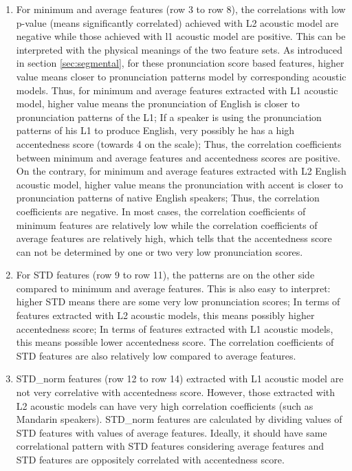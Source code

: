 \begin{enumerate}
 \item For minimum and average features (row 3 to row 8), the correlations with low p-value (means significantly correlated) achieved with L2 acoustic model are negative while those achieved with l1 acoustic model are positive. This can be interpreted with the physical meanings of the two feature sets. As introduced in section \ref{sec:segmental}, for these pronunciation score based features, higher value means closer to pronunciation patterns model by corresponding acoustic models. Thus, for minimum and average features extracted with L1 acoustic model, higher value means the pronunciation of English is closer to pronunciation patterns of the L1; If a speaker is using the pronunciation patterns of his L1 to produce English, very possibly he has a high accentedness score (towards 4 on the scale); Thus, the correlation coefficients between minimum and average features and accentedness scores are positive. On the contrary, for minimum and average features extracted with L2 English acoustic model, higher value means the pronunciation with accent is closer to pronunciation patterns of native English speakers; Thus, the correlation coefficients are negative. In most cases, the correlation coefficients of minimum features are relatively low while the correlation coefficients of average features are relatively high, which tells that the accentedness score can not be determined by one or two very low pronunciation scores.
 \item For STD features (row 9 to row 11), the patterns are on the other side compared to minimum and average features. This is also easy to interpret: higher STD means there are some very low pronunciation scores; In terms of features extracted with L2 acoustic models, this means possibly higher accentedness score; In terms of features extracted with L1 acoustic models, this means possible lower accentedness score. The correlation coefficients of STD features are also relatively low compared to average features.
 \item STD\_norm features (row 12 to row 14) extracted with L1 acoustic model are not very correlative with accentedness score. However, those extracted with L2 acoustic models can have very high correlation coefficients (such as Mandarin speakers). STD\_norm features are calculated by dividing values of STD features with values of average features. Ideally, it should have same correlational pattern with STD features considering average features and STD features are oppositely correlated with accentedness score.

\end{enumerate}

